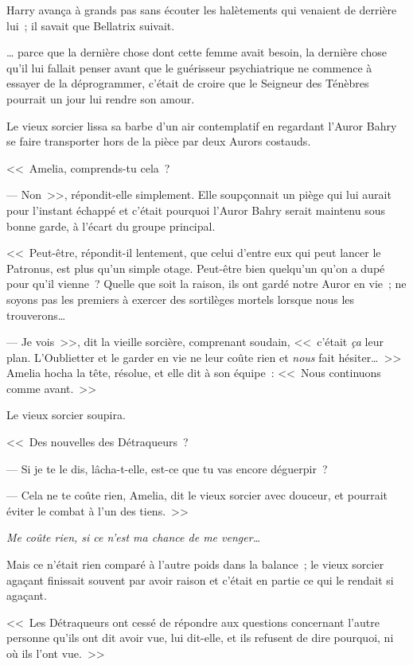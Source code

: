 Harry avança à grands pas sans écouter les halètements qui venaient de derrière lui~; il savait que Bellatrix suivait.

… parce que la dernière chose dont cette femme avait besoin, la dernière chose qu'il lui fallait penser avant que le guérisseur psychiatrique ne commence à essayer de la déprogrammer, c'était de croire que le Seigneur des Ténèbres pourrait un jour lui rendre son amour.

\later

Le vieux sorcier lissa sa barbe d'un air contemplatif en regardant l'Auror Bahry se faire transporter hors de la pièce par deux Aurors costauds.

<<~Amelia, comprends-tu cela~?

--- Non~>>, répondit-elle simplement. Elle soupçonnait un piège qui lui aurait pour l'instant échappé et c'était pourquoi l'Auror Bahry serait maintenu sous bonne garde, à l'écart du groupe principal.

<<~Peut-être, répondit-il lentement, que celui d'entre eux qui peut lancer le Patronus, est plus qu'un simple otage. Peut-être bien quelqu'un qu'on a dupé pour qu'il vienne~? Quelle que soit la raison, ils ont gardé notre Auror en vie~; ne soyons pas les premiers à exercer des sortilèges mortels lorsque nous les trouverons…

--- Je vois~>>, dit la vieille sorcière, comprenant soudain, <<~c'était \emph{ça} leur plan. L'Oublietter et le garder en vie ne leur coûte rien et \emph{nous} fait hésiter…~>> Amelia hocha la tête, résolue, et elle dit à son équipe~: <<~Nous continuons comme avant.~>>

Le vieux sorcier soupira.

<<~Des nouvelles des Détraqueurs~?

--- Si je te le dis, lâcha-t-elle, est-ce que tu vas encore déguerpir~?

--- Cela ne te coûte rien, Amelia, dit le vieux sorcier avec douceur, et pourrait éviter le combat à l'un des tiens.~>>

\emph{Me coûte rien, si ce n'est ma chance de me venger…}

Mais ce n'était rien comparé à l'autre poids dans la balance~; le vieux sorcier agaçant finissait souvent par avoir raison et c'était en partie ce qui le rendait si agaçant.

<<~Les Détraqueurs ont cessé de répondre aux questions concernant l'autre personne qu'ils ont dit avoir vue, lui dit-elle, et ils refusent de dire pourquoi, ni où ils l'ont vue.~>>

